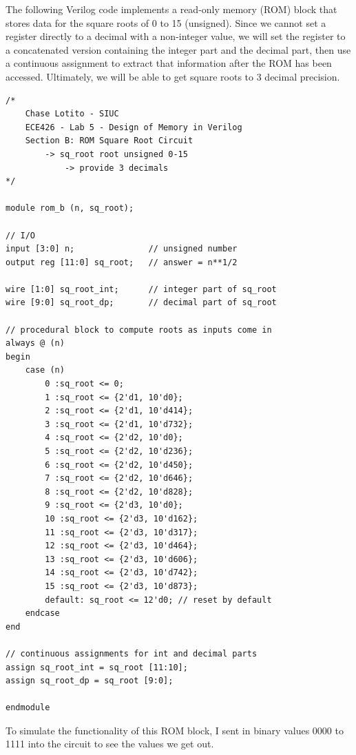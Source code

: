 \documentclass{article}
\begin{document}
The following Verilog code implements a read-only memory (ROM) block that stores data for the square roots of 0 to 15 (unsigned). Since we cannot set a register directly to a decimal with a non-integer value, we will set the register to a concatenated version containing the integer part and the decimal part, then use a continuous assignment to extract that information after the ROM has been accessed. Ultimately, we will be able to get square roots to 3 decimal precision.

\begin{lstlisting}
/*
    Chase Lotito - SIUC
    ECE426 - Lab 5 - Design of Memory in Verilog
    Section B: ROM Square Root Circuit
        -> sq_root root unsigned 0-15
            -> provide 3 decimals
*/

module rom_b (n, sq_root);

// I/O
input [3:0] n;               // unsigned number
output reg [11:0] sq_root;   // answer = n**1/2

wire [1:0] sq_root_int;      // integer part of sq_root
wire [9:0] sq_root_dp;       // decimal part of sq_root

// procedural block to compute roots as inputs come in
always @ (n)
begin
    case (n)
        0 :sq_root <= 0;
        1 :sq_root <= {2'd1, 10'd0};
        2 :sq_root <= {2'd1, 10'd414};
        3 :sq_root <= {2'd1, 10'd732};
        4 :sq_root <= {2'd2, 10'd0};
        5 :sq_root <= {2'd2, 10'd236};
        6 :sq_root <= {2'd2, 10'd450};
        7 :sq_root <= {2'd2, 10'd646};
        8 :sq_root <= {2'd2, 10'd828};
        9 :sq_root <= {2'd3, 10'd0};
        10 :sq_root <= {2'd3, 10'd162};
        11 :sq_root <= {2'd3, 10'd317};
        12 :sq_root <= {2'd3, 10'd464};
        13 :sq_root <= {2'd3, 10'd606};
        14 :sq_root <= {2'd3, 10'd742};
        15 :sq_root <= {2'd3, 10'd873};
        default: sq_root <= 12'd0; // reset by default
    endcase
end

// continuous assignments for int and decimal parts
assign sq_root_int = sq_root [11:10];
assign sq_root_dp = sq_root [9:0];

endmodule
\end{lstlisting}

To simulate the functionality of this ROM block, I sent in binary values 0000 to 1111 into the circuit to see the values we get out.
\end{document}
